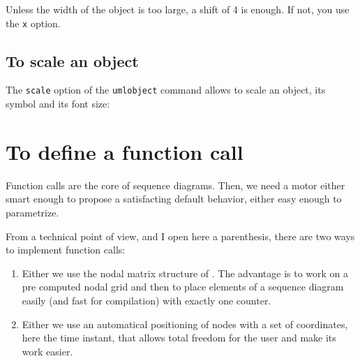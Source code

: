 \documentclass[a4paper,11pt]{report}
\begin{document}
Unless the width of the object is too large, a shift of 4 is enough. If not, you use the {\tt x} option.

\subsection{To scale an object}\label{ss.objdim}

The {\tt scale} option of the {\tt umlobject} command allows to scale an object, its symbol and its font size:

\medskip

\begin{minipage}{0.5\textwidth}
	
\end{minipage}
\begin{minipage}{0.5\textwidth}
	\begin{center}
	\end{center}
\end{minipage}

\begin{minipage}{0.5\textwidth}
	
\end{minipage}
\begin{minipage}{0.5\textwidth}
	\begin{center}
	\end{center}
\end{minipage}

\section{To define a function call}\label{s.calls}

Function calls are the core of sequence diagrams. Then, we need a motor either smart enough to propose a satisfacting default behavior, either easy enough to parametrize.

From a technical point of view, and I open here a parenthesis, there are two ways to implement function calls:

\begin{enumerate}
	\item Either we use the nodal matrix structure of \TikZ. The advantage is to work on a pre computed nodal grid and then to place elements of a sequence diagram easily (and fast for compilation) with exactly one counter.
	\item Either we use an automatical positioning of nodes with a set of coordinates, here the time instant, that allows total freedom for the user and make its work easier.
\end{enumerate}
\end{document}

